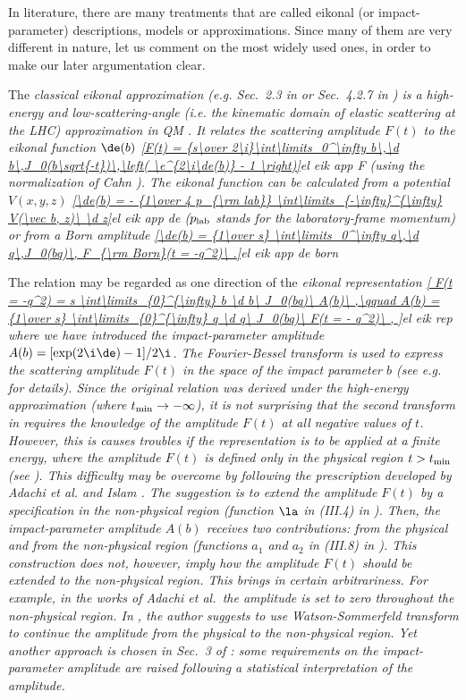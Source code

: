 In literature, there are many treatments that are called eikonal (or impact-parameter) descriptions, models or approximations. Since many of them are very different in nature, let us comment on the most widely used ones, in order to make our later argumentation clear.

The \em{classical eikonal approximation} (e.g. Sec.~2.3 in  or Sec.~4.2.7 in ) is a high-energy and low-scattering-angle (i.e. the kinematic domain of elastic scattering at the LHC) approximation in QM . It relates the scattering amplitude $F(t)$ to the eikonal function $\de(b)$
\eqref{F(t) = {s\over 2\i}\int\limits_0^\infty b\,\d b\,J_0(b\sqrt{-t})\,\left( \e^{2\i\de(b)} - 1 \right)}{el eik app F}
(using the normalization of Cahn ). The \em{eikonal} function can be calculated from a potential $V(x, y, z)$
\eqref{\de(b) = - {1\over 4 p_{\rm lab}} \int\limits_{-\infty}^{\infty} V(\vec b, z)\ \d z}{el eik app de}
($p_{\rm lab}$ stands for the laboratory-frame momentum) or from a Born amplitude
\eqref{\de(b) = {1\over s} \int\limits_0^\infty q\,\d q\,J_0(bq)\, F_{\rm Born}(t = -q^2)\ .}{el eik app de born}

The relation  may be regarded as one direction of the \em{eikonal representation}
\eqref{
	F(t = -q^2) = s \int\limits_{0}^{\infty} b \d b\ J_0(bq)\ A(b)\ ,\qquad
	A(b) = {1\over s} \int\limits_{0}^{\infty} q \d q\ J_0(bq)\ F(t = - q^2)\ ,
}{el eik rep}
where we have introduced the \em{impact-parameter amplitude} $A(b) = [\exp(2\i\de) - 1] / 2\i$.  The Fourier-Bessel transform is used to express the scattering amplitude $F(t)$ in the space of the impact parameter $b$ (see e.g.~ for details). Since the original relation  was derived under the high-energy approximation (where $t_{\rm min} \to -\infty$), it is not surprising that the second transform in  requires the knowledge of the amplitude $F(t)$ at all negative values of $t$. However, this is causes troubles if the representation is to be applied at a finite energy, where the amplitude $F(t)$ is defined only in the physical region $t > t_{\rm min}$ (see ). This difficulty may be overcome by following the prescription developed by Adachi et al.  and Islam . The suggestion is to extend the amplitude $F(t)$ by a specification in the non-physical region (function $\la$ in (III.4) in ). Then, the impact-parameter amplitude $A(b)$ receives two contributions: from the physical and from the non-physical region (functions $a_1$ and $a_2$ in (III.8) in ). This construction does not, however, imply how the amplitude $F(t)$ should be extended to the non-physical region. This brings in certain arbitrariness. For example, in the works of Adachi et al.~the amplitude is set to zero throughout the non-physical region. In , the author suggests to use Watson-Sommerfeld transform to continue the amplitude from the physical to the non-physical region. Yet another approach is chosen in Sec.~3 of : some requirements on the impact-parameter amplitude are raised following a statistical interpretation of the amplitude.

